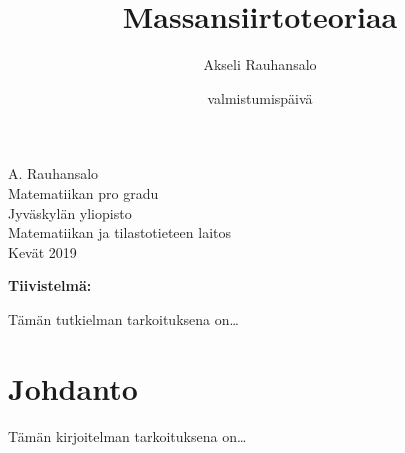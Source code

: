 
\title{Massansiirtoteoriaa}
\author{Akseli Rauhansalo}
\date{valmistumispäivä}


\thispagestyle{empty}                   %
\begin{center}                          %
\null\vspace{3cm}                       %
\Large                                  %
\large                                  %
A. Rauhansalo\\[1cm]                    %
\vfill                                  %
\normalsize                             %
Matematiikan pro gradu\\[1cm]           %
Jyväskylän yliopisto\\                  %
Matematiikan ja tilastotieteen laitos\\ %
Kevät 2019                              %
\end{center}                            %
\frontmatter

\noindent
\textbf{Tiivistelmä:}

\vspace{1pc}
Tämän tutkielman tarkoituksena on\dots


\newpage
\setcounter{tocdepth}{2}
\thispagestyle{empty}
\tableofcontents

\thispagestyle{empty}

\chapter*{Johdanto}
%
Tämän kirjoitelman tarkoituksena on\dots

